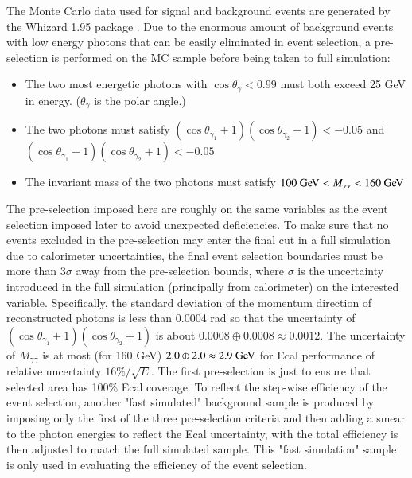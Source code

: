 \documentclass[11pt,a4paper]{cepcnote}
\begin{document}
The Monte Carlo data used for signal and background events are generated by the Whizard 1.95 package \cite{Kilian:2007gr}. Due to the enormous amount of background events with low energy photons that can be easily eliminated in event selection, a pre-selection is performed on the MC sample before being taken to full simulation:
\begin{itemize}
\item The two most energetic photons with $\cos\theta_\gamma < 0.99$ must both exceed 25 GeV in energy. ($\theta_\gamma$ is the polar angle.)
\item The two photons must satisfy $(\cos\theta_{\gamma_1}+1)(\cos\theta_{\gamma_2}-1) < -0.05$ and $(\cos\theta_{\gamma_1}-1)(\cos\theta_{\gamma_2}+1) < -0.05$
\item The invariant mass of the two photons must satisfy $100\GeV<M_{\gamma\gamma}<160\GeV$
\end{itemize}
The pre-selection imposed here are roughly on the same variables as the event selection imposed later to avoid unexpected deficiencies. To make sure that no events excluded in the pre-selection may enter the final cut in a full simulation due to calorimeter uncertainties, the final event selection boundaries must be more than 3$\sigma$ away from the pre-selection bounds, where $\sigma$ is the uncertainty introduced in the full simulation (principally from calorimeter) on the interested variable. Specifically, the standard deviation of the momentum direction of reconstructed photons is less than 0.0004 rad so that the uncertainty of $(\cos\theta_{\gamma_1}\pm1)(\cos\theta_{\gamma_2}\pm1)$ is about $0.0008\oplus0.0008\approx0.0012$. The uncertainty of $M_{\gamma\gamma}$ is at most (for 160 GeV) $2.0\oplus2.0\approx2.9\GeV$ for Ecal performance of relative uncertainty $16\%/\sqrt{E}$. The first pre-selection is just to ensure that selected area has 100\% Ecal coverage. To reflect the step-wise efficiency of the event selection, another "fast simulated" background sample is produced by imposing only the first of the three pre-selection criteria and then adding a smear to the photon energies to reflect the Ecal uncertainty, with the total efficiency is then adjusted to match the full simulated sample. This "fast simulation" sample is only used in evaluating the efficiency of the event selection. 

\end{document}
